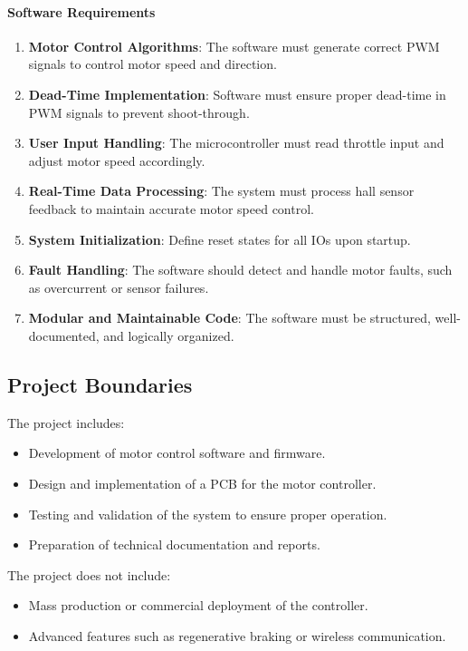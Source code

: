 \paragraph{Software Requirements}
\begin{enumerate}[label=S\arabic*.]
    \item \textbf{Motor Control Algorithms}: The software must generate correct PWM signals to control motor speed and direction.
    \item \textbf{Dead-Time Implementation}: Software must ensure proper dead-time in PWM signals to prevent shoot-through.
    \item \textbf{User Input Handling}: The microcontroller must read throttle input and adjust motor speed accordingly.
    \item \textbf{Real-Time Data Processing}: The system must process hall sensor feedback to maintain accurate motor speed control.
    \item \textbf{System Initialization}: Define reset states for all IOs upon startup.
    \item \textbf{Fault Handling}: The software should detect and handle motor faults, such as overcurrent or sensor failures.
    \item \textbf{Modular and Maintainable Code}: The software must be structured, well-documented, and logically organized.
\end{enumerate}

\subsection{Project Boundaries}
The project includes:
\begin{itemize}
    \item Development of motor control software and firmware.
    \item Design and implementation of a PCB for the motor controller.
    \item Testing and validation of the system to ensure proper operation.
    \item Preparation of technical documentation and reports.
\end{itemize}
The project does not include:
\begin{itemize}
    \item Mass production or commercial deployment of the controller.
    \item Advanced features such as regenerative braking or wireless communication.
\end{itemize}

